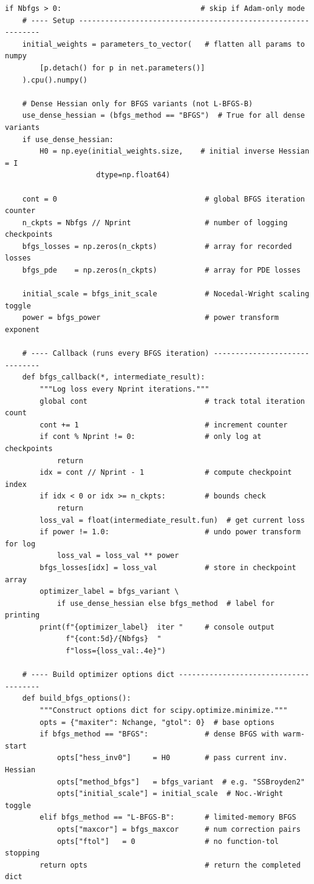 \documentclass[11pt,a4paper]{article}
\begin{document}
\begin{lstlisting}
if Nbfgs > 0:                                # skip if Adam-only mode
    # ---- Setup -------------------------------------------------------------
    initial_weights = parameters_to_vector(   # flatten all params to numpy
        [p.detach() for p in net.parameters()]
    ).cpu().numpy()

    # Dense Hessian only for BFGS variants (not L-BFGS-B)
    use_dense_hessian = (bfgs_method == "BFGS")  # True for all dense variants
    if use_dense_hessian:
        H0 = np.eye(initial_weights.size,    # initial inverse Hessian = I
                     dtype=np.float64)

    cont = 0                                  # global BFGS iteration counter
    n_ckpts = Nbfgs // Nprint                 # number of logging checkpoints
    bfgs_losses = np.zeros(n_ckpts)           # array for recorded losses
    bfgs_pde    = np.zeros(n_ckpts)           # array for PDE losses

    initial_scale = bfgs_init_scale           # Nocedal-Wright scaling toggle
    power = bfgs_power                        # power transform exponent

    # ---- Callback (runs every BFGS iteration) ------------------------------
    def bfgs_callback(*, intermediate_result):
        """Log loss every Nprint iterations."""
        global cont                           # track total iteration count
        cont += 1                             # increment counter
        if cont % Nprint != 0:                # only log at checkpoints
            return
        idx = cont // Nprint - 1              # compute checkpoint index
        if idx < 0 or idx >= n_ckpts:         # bounds check
            return
        loss_val = float(intermediate_result.fun)  # get current loss
        if power != 1.0:                      # undo power transform for log
            loss_val = loss_val ** power
        bfgs_losses[idx] = loss_val           # store in checkpoint array
        optimizer_label = bfgs_variant \
            if use_dense_hessian else bfgs_method  # label for printing
        print(f"{optimizer_label}  iter "     # console output
              f"{cont:5d}/{Nbfgs}  "
              f"loss={loss_val:.4e}")

    # ---- Build optimizer options dict --------------------------------------
    def build_bfgs_options():
        """Construct options dict for scipy.optimize.minimize."""
        opts = {"maxiter": Nchange, "gtol": 0}  # base options
        if bfgs_method == "BFGS":             # dense BFGS with warm-start
            opts["hess_inv0"]     = H0        # pass current inv. Hessian
            opts["method_bfgs"]   = bfgs_variant  # e.g. "SSBroyden2"
            opts["initial_scale"] = initial_scale  # Noc.-Wright toggle
        elif bfgs_method == "L-BFGS-B":       # limited-memory BFGS
            opts["maxcor"] = bfgs_maxcor      # num correction pairs
            opts["ftol"]   = 0                # no function-tol stopping
        return opts                           # return the completed dict


\end{lstlisting}
\end{document}
